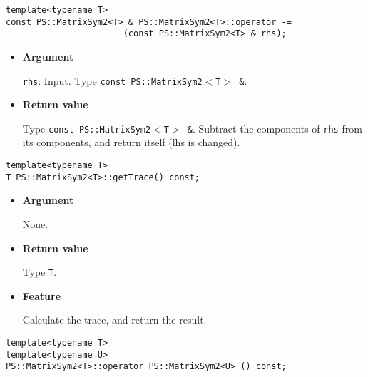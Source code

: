 \begin{screen}
\begin{verbatim}
template<typename T>
const PS::MatrixSym2<T> & PS::MatrixSym2<T>::operator -= 
                       (const PS::MatrixSym2<T> & rhs);
\end{verbatim}
\end{screen}

\begin{itemize}

\item{{\bf Argument}}

\texttt{rhs}: Input. Type \texttt{const PS::MatrixSym2$<$T$>$ \&}.

\item{{\bf Return value}}

Type \texttt{const PS::MatrixSym2$<$T$>$ \&}. Subtract the components of \texttt{rhs} from
its components, and return itself (lhs is changed).

\end{itemize}


\begin{screen}
\begin{verbatim}
template<typename T>
T PS::MatrixSym2<T>::getTrace() const;
\end{verbatim}
\end{screen}

\begin{itemize}

\item{{\bf Argument}}

  None.

\item{{\bf Return value}}

  Type \texttt{T}.

\item{{\bf Feature}}

  Calculate the trace, and return the result.

\end{itemize}


\begin{screen}
\begin{verbatim}
template<typename T>
template<typename U>
PS::MatrixSym2<T>::operator PS::MatrixSym2<U> () const;
\end{verbatim}
\end{screen}

